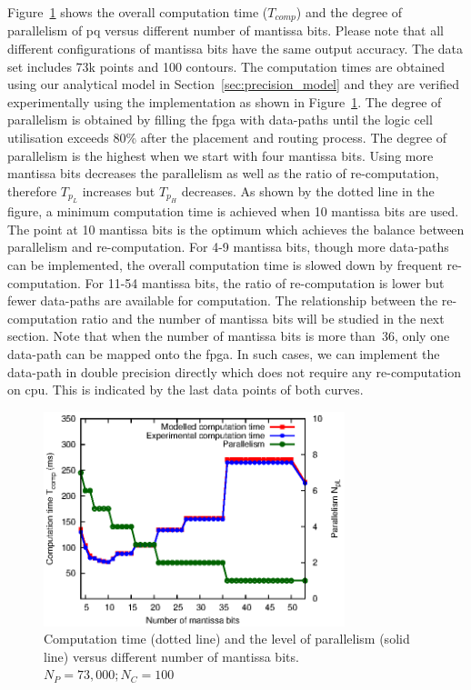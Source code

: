 Figure~\ref{fig:exectime} shows the overall computation time ($T_{comp}$)
and the degree of parallelism of \gls{pq} versus different number of mantissa bits.
Please note that all different configurations of mantissa bits have the same output accuracy.
The data set includes 73k points and 100 contours.
The computation times are obtained using our analytical model in Section~\ref{sec:precision_model} and they are verified experimentally using the implementation as shown in Figure~\ref{fig:exectime}.
The degree of parallelism is obtained by filling the \gls{fpga} with data-paths until the logic cell utilisation exceeds 80\% after the placement and routing process.
The degree of parallelism is the highest when we start with four mantissa bits.
Using more mantissa bits decreases the parallelism as well as the ratio of re-computation, therefore $T_{p_L}$ increases but $T_{p_H}$ decreases.
As shown by the dotted line in the figure, a minimum computation time is achieved when 10 mantissa bits are used.
The point at 10 mantissa bits is the optimum which achieves the balance between parallelism and re-computation.
For 4-9 mantissa bits, though more data-paths can be implemented, the overall computation time is slowed down by frequent re-computation.
For 11-54 mantissa bits, the ratio of re-computation is lower but fewer data-paths are available for computation.
The relationship between the re-computation ratio and the number of mantissa bits will be studied in the next section.
Note that when the number of mantissa bits is more than~36, only one data-path can be mapped onto the \gls{fpga}.
In such cases, we can implement the data-path in double precision directly which does not require any re-computation on \gls{cpu}.
This is indicated by the last data points of both curves.

\begin{figure}[ht]
\begin{center}
\includegraphics[width=0.78\textwidth]{3_precision/figures/fig_exectime}
\end{center}
\caption[Computation time and the level of parallelism versus different number of mantissa bits.]{Computation time (dotted line) and the level of parallelism (solid line) versus different number of mantissa bits. $N_P = 73,000; N_C = 100$}
\label{fig:exectime}
\end{figure}


